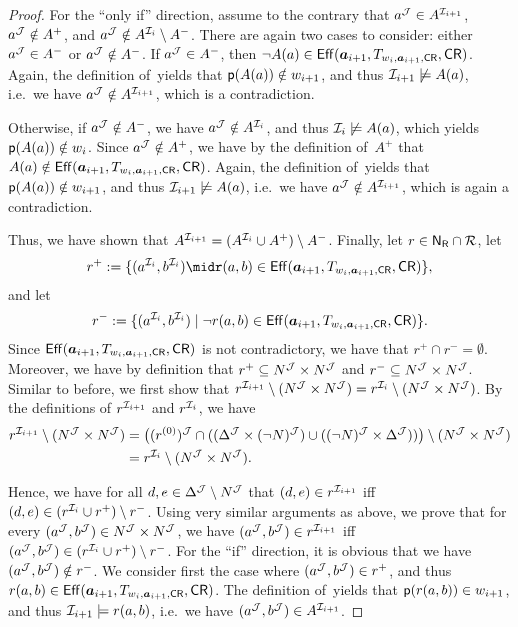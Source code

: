 \begin{proof}
    For the \enquote{only if} direction, assume to the contrary that
    $a^\mathcal{J}\in A^{\mathcal{I}_{i+1}}$, $a^\mathcal{J}\notin A^+$, and
    $a^\mathcal{J}\notin A^{\mathcal{I}_i}\setminus A^-$.  There are again two cases to
    consider: either $a^\mathcal{J}\in A^-$ or $a^\mathcal{J}\notin A^-$.  If $a^\mathcal{J}\in A^-$,
    then $\lnot A(a)\in\operatorname{\mathsf{Eff}}(\boldsymbol a_{i+1},T_{w_i,\boldsymbol a_{i+1},\mathsf{CR}},\mathsf{CR})$.  Again, the
    definition of~\Deltah yields that $\mathsf{p}(A(a))\notin w_{i+1}$, and thus
    $\mathcal{I}_{i+1}\not\models A(a)$, i.e.~we have $a^\mathcal{J}\notin A^{\mathcal{I}_{i+1}}$,
    which is a contradiction.

    Otherwise, if $a^\mathcal{J}\notin A^-$, we have $a^\mathcal{J}\notin A^{\mathcal{I}_i}$, and
    thus $\mathcal{I}_i\not\models A(a)$, which yields $\mathsf{p}(A(a))\notin w_i$.  Since
    $a^\mathcal{J}\notin A^+$, we have by the definition of~$A^+$ that
    $A(a)\notin\operatorname{\mathsf{Eff}}(\boldsymbol a_{i+1},T_{w_i,\boldsymbol a_{i+1},\mathsf{CR}},\mathsf{CR})$.  Again, the
    definition of~\Deltah yields that $\mathsf{p}(A(a))\notin w_{i+1}$, and thus
    $\mathcal{I}_{i+1}\not\models A(a)$, i.e.~we have $a^\mathcal{J}\notin A^{\mathcal{I}_{i+1}}$,
    which is again a contradiction.

    Thus, we have shown that $A^{\mathcal{I}_{i+1}}=(A^{\mathcal{I}_i}\cup A^+)\setminus A^-$.
    Finally, let $r\in\mathsf{N_R}\cap\mathcal{R}$, let
    \[r^+:=\{(a^{\Imc_i},b^{\Imc_i})\mid%
        r(a,b)\in\Eff(\abf_{i+1},T_{w_i,\abf_{i+1},\CR},\CR)\},\]
    and let
    \[r^-:=\{(a^{\Imc_i},b^{\Imc_i})\mid%
        \lnot r(a,b)\in\Eff(\abf_{i+1},T_{w_i,\abf_{i+1},\CR},\CR)\}.\]
    Since $\operatorname{\mathsf{Eff}}(\boldsymbol a_{i+1},T_{w_i,\boldsymbol a_{i+1},\mathsf{CR}},\mathsf{CR})$ is not contradictory, we
    have that $r^+\cap r^-=\emptyset$.  Moreover, we have by definition that
    $r^+\subseteq N^\mathcal{J}\times N^\mathcal{J}$ and $r^-\subseteq N^\mathcal{J}\times N^\mathcal{J}$.
    Similar to before, we first show that
    $r^{\mathcal{I}_{i+1}}\setminus(N^\mathcal{J}\times N^\mathcal{J})=r^{\mathcal{I}_i}\setminus(N^\mathcal{J}\times N^\mathcal{J})$.
    By the definitions of $r^{\mathcal{I}_{i+1}}$ and $r^{\mathcal{I}_i}$, we have
    \begin{align*}
        r^{\Imc_{i+1}}\setminus(N^\Jmc\times N^\Jmc)
        &=\bigl((r^{(0)})^\Jmc\cap((\Delta^\Jmc\times(\lnot N)^\Jmc)\cup%
            ((\lnot N)^\Jmc\times\Delta^\Jmc))\bigr)\setminus(N^\Jmc\times N^\Jmc)\\
        &=r^{\Imc_i}\setminus(N^\Jmc\times N^\Jmc).
    \end{align*}

    \noindent
    Hence, we have for all $d,e\in\Delta^\mathcal{J}\setminus N^\mathcal{J}$ that
    $(d,e)\in r^{\mathcal{I}_{i+1}}$ iff $(d,e)\in(r^{\mathcal{I}_i}\cup r^+)\setminus r^-$.
    Using very similar arguments as above, we prove that for every
    $(a^\mathcal{J},b^\mathcal{J})\in N^\mathcal{J}\times N^\mathcal{J}$, we have
    $(a^\mathcal{J},b^\mathcal{J})\in r^{\mathcal{I}_{i+1}}$ iff
    $(a^\mathcal{J},b^\mathcal{J})\in(r^{\mathcal{I}_i}\cup r^+)\setminus r^-$.
    For the \enquote{if} direction, it is obvious that we have
    $(a^\mathcal{J},b^\mathcal{J})\notin r^-$.  We consider first the case where
    $(a^\mathcal{J},b^\mathcal{J})\in r^+$, and thus
    $r(a,b)\in\operatorname{\mathsf{Eff}}(\boldsymbol a_{i+1},T_{w_i,\boldsymbol a_{i+1},\mathsf{CR}},\mathsf{CR})$.  The definition
    of~\Deltah yields that $\mathsf{p}(r(a,b))\in w_{i+1}$, and thus
    $\mathcal{I}_{i+1}\models r(a,b)$, i.e.~we have
    $(a^\mathcal{J},b^\mathcal{J})\in A^{\mathcal{I}_{i+1}}$.


\end{proof}

